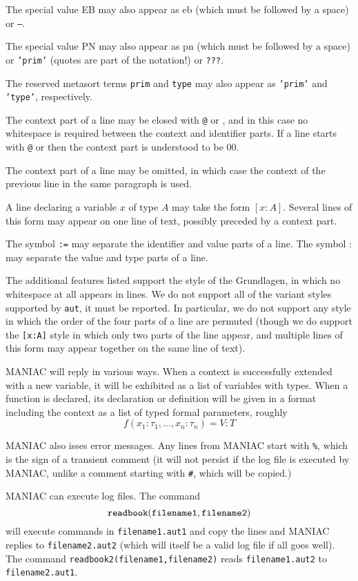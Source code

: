 \documentclass[12pt]{article}
\begin{document}
The special value EB may also appear as eb (which must be followed by a space) or {\tt ---}.

The special value PN may also appear as pn (which must be followed by a space) or {\tt 'prim'} (quotes are part of the notation!) or {\tt ???}.

The reserved metasort terms {\tt prim} and {\tt type} may also appear as {\tt 'prim'} and {\tt 'type'}, respectively.

The context part of a line may be closed with {\tt @} or {\tt *}, and in this case no whitespace is required between the context and identifier parts.  If a line starts with
{\tt @} or {\tt *} then the context part is understood to be 00.

The context part of a line may be omitted, in which case the context of the previous line in the same paragraph is used.

A line declaring a variable $x$ of type $A$ may take the form $[x:A]$.  Several lines of this form may appear on one line of text, possibly preceded by a context part.

The symbol {\tt :=} may separate the identifier and value parts of a line.  The symbol : may separate the value and type parts of a line.

The additional features listed support the style of the Grundlagen, in which no whitespace at all appears in lines.  We do not support all of the variant styles supported by {\tt aut}, it must be reported.  In particular, we do not support any style in which the order of the four parts of a line are permuted (though we do support the {\tt [x:A]} style in which only two
parts of the line appear, and multiple lines of this form may appear together on the same line of text).

MANIAC will reply in various ways.  When a context is successfully extended with a new variable, it will be exhibited as a list of variables with types.  When a function is declared,
its declaration or definition will be given in a format including the context as a list of typed formal parameters, roughly $$f(x_1:\tau_1, \ldots,x_n:\tau_n) = V:T$$ 

MANIAC also isses error messages.  Any lines from MANIAC start with {\tt \%}, which is the sign of a transient comment (it will not persist if the log file is executed by MANIAC, unlike a comment starting with {\tt \#}, which will be copied.)

MANIAC can execute log files.  The command $${\tt readbook(filename1,filename2)}$$ will execute commands in {\tt filename1.aut1} and copy the lines and MANIAC replies to
{\tt filename2.aut2} (which will itself be a valid log file if all goes well).   The command {\tt readbook2(filename1,filename2)}  reads {\tt filename1.aut2} to {\tt filename2.aut1}.
\end{document}
